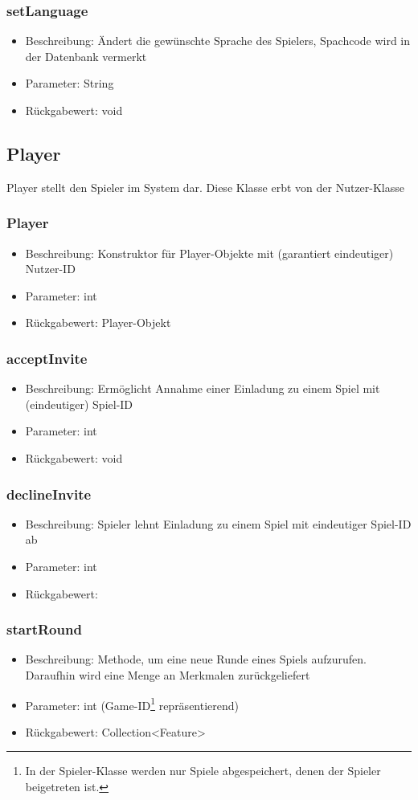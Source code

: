 \documentclass[a4paper]{scrreprt}
\begin{document}
	\subsubsection{setLanguage}
	\begin{itemize}
		\item Beschreibung: Ändert die gewünschte Sprache des Spielers, Spachcode wird in der Datenbank vermerkt
		\item Parameter: String
		\item Rückgabewert: void
	\end{itemize}

	\subsection{Player}
	Player stellt den Spieler im System dar. Diese Klasse erbt von der Nutzer-Klasse
	\subsubsection{Player}
	\begin{itemize}
		\item Beschreibung: Konstruktor für Player-Objekte mit (garantiert eindeutiger) Nutzer-ID
		\item Parameter: int
		\item Rückgabewert: Player-Objekt
	\end{itemize}
	\subsubsection{acceptInvite}
	\begin{itemize}
		\item Beschreibung: Ermöglicht Annahme einer Einladung zu einem Spiel mit (eindeutiger) Spiel-ID
		\item Parameter: int
		\item Rückgabewert: void
	\end{itemize}
	\subsubsection{declineInvite}
	\begin{itemize}
		\item Beschreibung: Spieler lehnt Einladung zu einem Spiel mit eindeutiger Spiel-ID ab
		\item Parameter: int
		\item Rückgabewert:
	\end{itemize}
	\subsubsection{startRound}
	\begin{itemize}
		\item Beschreibung: Methode, um eine neue Runde eines Spiels aufzurufen. Daraufhin wird eine Menge an Merkmalen zurückgeliefert
		\item Parameter: int (Game-ID\footnote{In der Spieler-Klasse werden nur Spiele abgespeichert, denen der Spieler beigetreten ist.} repräsentierend)
		\item Rückgabewert: Collection<Feature>
	\end{itemize}
\end{document}
